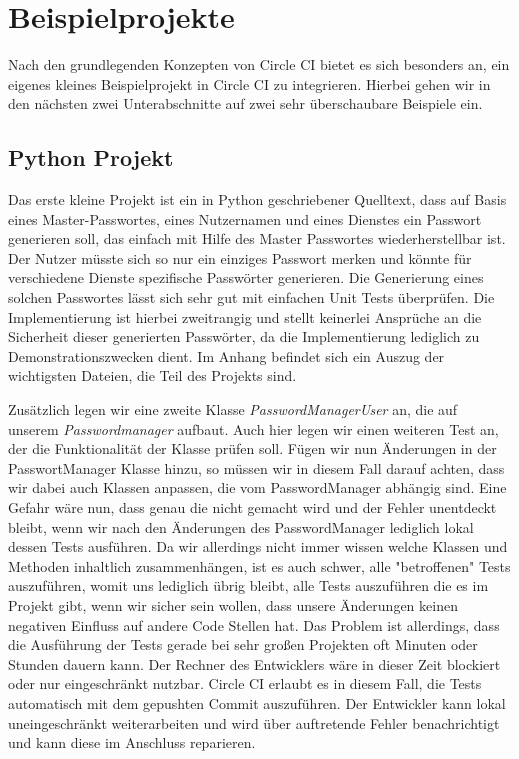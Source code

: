 \documentclass[11pt]{article}
\begin{document}
\section{Beispielprojekte}
Nach den grundlegenden Konzepten von Circle CI bietet es sich besonders an, ein eigenes kleines
Beispielprojekt in Circle CI zu integrieren. Hierbei gehen wir in den nächsten zwei Unterabschnitte
auf zwei sehr überschaubare Beispiele ein.

\subsection{Python Projekt}
Das erste kleine Projekt ist ein in Python geschriebener Quelltext, dass auf Basis eines Master-Passwortes, eines Nutzernamen und eines Dienstes ein Passwort generieren soll, das einfach mit Hilfe des Master Passwortes wiederherstellbar ist. Der Nutzer müsste sich so nur ein einziges Passwort merken und könnte für verschiedene Dienste spezifische Passwörter generieren. Die Generierung eines solchen Passwortes lässt sich sehr gut mit einfachen Unit Tests überprüfen. Die Implementierung ist hierbei zweitrangig und stellt keinerlei Ansprüche an die Sicherheit dieser generierten Passwörter, da die Implementierung lediglich zu Demonstrationszwecken dient. Im Anhang befindet sich ein Auszug der wichtigsten Dateien, die Teil des Projekts sind.

Zusätzlich legen wir eine zweite Klasse \textit{PasswordManagerUser} an, die auf unserem \textit{Passwordmanager} aufbaut. Auch hier legen wir einen weiteren Test an, der die Funktionalität der Klasse prüfen soll. Fügen wir nun Änderungen in der PasswortManager Klasse hinzu, so müssen wir in diesem Fall darauf achten, dass wir dabei auch Klassen anpassen, die vom PasswordManager abhängig sind. Eine Gefahr wäre nun, dass genau die nicht gemacht wird und der Fehler unentdeckt bleibt, wenn wir nach den Änderungen des PasswordManager lediglich lokal dessen Tests ausführen. Da wir allerdings nicht immer wissen welche Klassen und Methoden inhaltlich zusammenhängen, ist es auch  schwer, alle "betroffenen" Tests auszuführen, womit uns lediglich übrig bleibt, alle Tests auszuführen die es im Projekt gibt, wenn wir sicher sein wollen, dass unsere Änderungen keinen negativen Einfluss auf andere Code Stellen hat. Das Problem ist allerdings, dass die Ausführung der Tests gerade bei sehr großen Projekten oft Minuten oder Stunden dauern kann. Der Rechner des Entwicklers wäre in dieser Zeit blockiert oder nur eingeschränkt nutzbar. Circle CI erlaubt es in diesem Fall, die Tests automatisch mit dem gepushten Commit auszuführen. Der Entwickler kann lokal uneingeschränkt weiterarbeiten und wird über auftretende Fehler benachrichtigt und kann diese im Anschluss reparieren.
\end{document}
